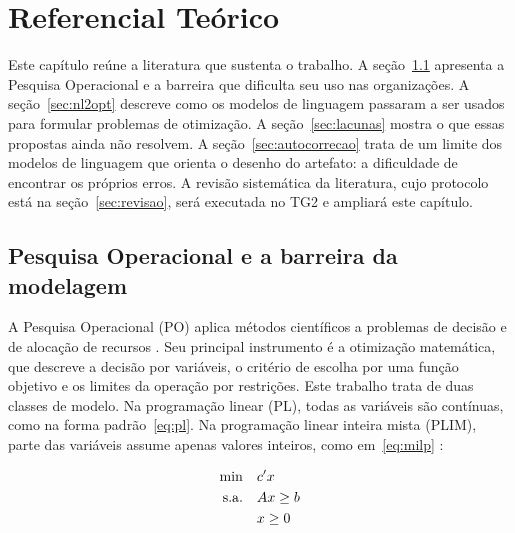 \chapter{Referencial Teórico}

Este capítulo reúne a literatura que sustenta o trabalho. A seção~\ref{sec:po-barreira} apresenta a Pesquisa Operacional e a barreira que dificulta seu uso nas organizações. A seção~\ref{sec:nl2opt} descreve como os modelos de linguagem passaram a ser usados para formular problemas de otimização. A seção~\ref{sec:lacunas} mostra o que essas propostas ainda não resolvem. A seção~\ref{sec:autocorrecao} trata de um limite dos modelos de linguagem que orienta o desenho do artefato: a dificuldade de encontrar os próprios erros. A revisão sistemática da literatura, cujo protocolo está na seção~\ref{sec:revisao}, será executada no TG2 e ampliará este capítulo.

\section{Pesquisa Operacional e a barreira da modelagem}
\label{sec:po-barreira}

A Pesquisa Operacional (PO) aplica métodos científicos a problemas de decisão e de alocação de recursos \cite{arenales2007}. Seu principal instrumento é a otimização matemática, que descreve a decisão por variáveis, o critério de escolha por uma função objetivo e os limites da operação por restrições. Este trabalho trata de duas classes de modelo. Na programação linear (PL), todas as variáveis são contínuas, como na forma padrão~\eqref{eq:pl}. Na programação linear inteira mista (PLIM), parte das variáveis assume apenas valores inteiros, como em~\eqref{eq:milp} \cite{arenales2007}:

\begin{align}
  \min \quad & c'x \notag \\
  \text{s.a.} \quad & Ax \geq b \label{eq:pl} \\
  & x \geq 0 \notag
\end{align}


